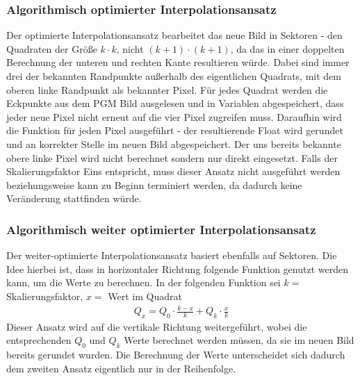 \documentclass[course=erap]{aspdoc}
\begin{document}
\subsubsection{Algorithmisch optimierter Interpolationsansatz}
Der optimierte Interpolationsansatz bearbeitet das neue Bild in Sektoren - den Quadraten der Größe $k \cdot k$, nicht $(k+1) \cdot (k+1)$, da das in einer doppelten Berechnung der unteren und rechten Kante resultieren würde. Dabei sind immer drei der bekannten Randpunkte außerhalb des eigentlichen Quadrats, mit dem oberen linke Randpunkt als bekannter Pixel. Für jedes Quadrat werden die Eckpunkte aus dem PGM Bild ausgelesen und in Variablen abgespeichert, dass jeder neue Pixel nicht erneut auf die vier Pixel zugreifen muss. Daraufhin wird die Funktion für jeden Pixel ausgeführt - der resultierende Float wird gerundet und an korrekter Stelle im neuen Bild abgespeichert. Der uns bereits bekannte obere linke Pixel wird nicht berechnet sondern nur direkt eingesetzt. Falls der Skalierungsfaktor Eins entspricht, muss dieser Ansatz nicht ausgeführt werden beziehungsweise kann zu Beginn terminiert werden, da dadurch keine Veränderung stattfinden würde.


\subsubsection{Algorithmisch weiter optimierter Interpolationsansatz}
Der weiter-optimierte Interpolationsansatz basiert ebenfalls auf Sektoren. Die Idee hierbei ist, dass in horizontaler Richtung folgende Funktion genutzt werden kann, um die Werte zu berechnen. In der folgenden Funktion sei $k =$ Skalierungsfaktor, $x =$ Wert im Quadrat
\begin{align}
    Q_{x} {=} Q_{0} \cdot \frac{k-x}{k} + Q_{k} \cdot \frac{x}{k}
\end{align}
Dieser Ansatz wird auf die vertikale Richtung weitergeführt, wobei die entsprechenden $Q_{0}$ und $Q_{k}$ Werte berechnet werden müssen, da sie im neuen Bild bereits gerundet wurden. Die Berechnung der Werte unterscheidet sich dadurch dem zweiten Ansatz eigentlich nur in der Reihenfolge.
\end{document}
